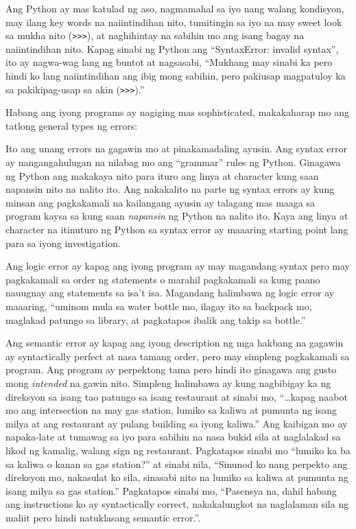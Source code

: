 \documentclass[10pt,]{book}
\providecommand{\tightlist}{%
  \setlength{\itemsep}{0pt}\setlength{\parskip}{0pt}}
\begin{document}
Ang Python ay mas katulad ng aso, nagmamahal sa iyo nang walang
kondisyon, may ilang key words na naiintindihan nito, tumitingin sa iyo
na may sweet look sa mukha nito
(\texttt{\textgreater{}\textgreater{}\textgreater{}}), at naghihintay na
sabihin mo ang isang bagay na naiintindihan nito. Kapag sinabi ng Python
ang ``SyntaxError: invalid syntax'', ito ay nagwa-wag lang ng buntot at
nagsasabi, ``Mukhang may sinabi ka pero hindi ko lang naiintindihan ang
ibig mong sabihin, pero pakiusap magpatuloy ka sa pakikipag-usap sa akin
(\texttt{\textgreater{}\textgreater{}\textgreater{}}).''

Habang ang iyong programs ay nagiging mas sophisticated, makakaharap mo
ang tatlong general types ng errors:

\begin{description}
\tightlist
\item[Syntax errors]
Ito ang unang errors na gagawin mo at pinakamadaling ayusin. Ang syntax
error ay nangangahulugan na nilabag mo ang ``grammar'' rules ng Python.
Ginagawa ng Python ang makakaya nito para ituro ang linya at character
kung saan napansin nito na nalito ito. Ang nakakalito na parte ng syntax
errors ay kung minsan ang pagkakamali na kailangang ayusin ay talagang
mas maaga sa program kaysa sa kung saan \emph{napansin} ng Python na
nalito ito. Kaya ang linya at character na itinuturo ng Python sa syntax
error ay maaaring starting point lang para sa iyong investigation.
\item[Logic errors]
Ang logic error ay kapag ang iyong program ay may magandang syntax pero
may pagkakamali sa order ng statements o marahil pagkakamali sa kung
paano nauugnay ang statements sa isa't isa. Magandang halimbawa ng logic
error ay maaaring, ``uminom mula sa water bottle mo, ilagay ito sa
backpack mo, maglakad patungo sa library, at pagkatapos ibalik ang takip
sa bottle.''
\item[Semantic errors]
Ang semantic error ay kapag ang iyong description ng mga hakbang na
gagawin ay syntactically perfect at nasa tamang order, pero may simpleng
pagkakamali sa program. Ang program ay perpektong tama pero hindi ito
ginagawa ang gusto mong \emph{intended} na gawin nito. Simpleng
halimbawa ay kung nagbibigay ka ng direksyon sa isang tao patungo sa
isang restaurant at sinabi mo, ``\ldots kapag naabot mo ang intersection
na may gas station, lumiko sa kaliwa at pumunta ng isang milya at ang
restaurant ay pulang building sa iyong kaliwa.'' Ang kaibigan mo ay
napaka-late at tumawag sa iyo para sabihin na nasa bukid sila at
naglalakad sa likod ng kamalig, walang sign ng restaurant. Pagkatapos
sinabi mo ``lumiko ka ba sa kaliwa o kanan sa gas station?'' at sinabi
nila, ``Sinunod ko nang perpekto ang direksyon mo, nakasulat ko sila,
sinasabi nito na lumiko sa kaliwa at pumunta ng isang milya sa gas
station.'' Pagkatapos sinabi mo, ``Pasensya na, dahil habang ang
instructions ko ay syntactically correct, nakakalungkot na naglalaman
sila ng maliit pero hindi natuklasang semantic error.''.
\end{description}
\end{document}
